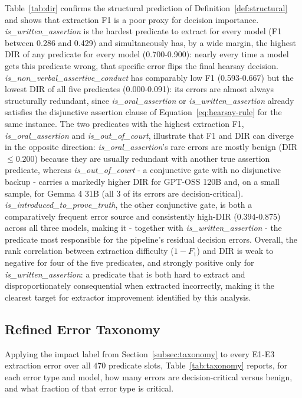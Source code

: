 Table~\ref{tab:dir} confirms the structural prediction of Definition~\ref{def:structural} and shows that extraction F1 is a poor proxy for decision importance. \textit{is\_written\_assertion} is the hardest predicate to extract for every model (F1 between 0.286 and 0.429) and simultaneously has, by a wide margin, the highest DIR of any predicate for every model (0.700-0.900): nearly every time a model gets this predicate wrong, that specific error flips the final hearsay decision. \textit{is\_non\_verbal\_assertive\_conduct} has comparably low F1 (0.593-0.667) but the lowest DIR of all five predicates (0.000-0.091): its errors are almost always structurally redundant, since \textit{is\_oral\_assertion} or \textit{is\_written\_assertion} already satisfies the disjunctive assertion clause of Equation~\ref{eq:hearsay-rule} for the same instance. The two predicates with the highest extraction F1, \textit{is\_oral\_assertion} and \textit{is\_out\_of\_court}, illustrate that F1 and DIR can diverge in the opposite direction: \textit{is\_oral\_assertion}'s rare errors are mostly benign (DIR $\leq 0.200$) because they are usually redundant with another true assertion predicate, whereas \textit{is\_out\_of\_court} - a conjunctive gate with no disjunctive backup - carries a markedly higher DIR for GPT-OSS 120B and, on a small sample, for Gemma 4 31B (all 3 of its errors are decision-critical). \textit{is\_introduced\_to\_prove\_truth}, the other conjunctive gate, is both a comparatively frequent error source and consistently high-DIR (0.394-0.875) across all three models, making it - together with \textit{is\_written\_assertion} - the predicate most responsible for the pipeline's residual decision errors. Overall, the rank correlation between extraction difficulty ($1 - F_1$) and DIR is weak to negative for four of the five predicates, and strongly positive only for \textit{is\_written\_assertion}: a predicate that is both hard to extract and disproportionately consequential when extracted incorrectly, making it the clearest target for extractor improvement identified by this analysis.

\subsection{Refined Error Taxonomy}
\label{subsec:taxonomy-results}
Applying the impact label from Section~\ref{subsec:taxonomy} to every E1-E3 extraction error over all $470$ predicate slots, Table~\ref{tab:taxonomy} reports, for each error type and model, how many errors are decision-critical versus benign, and what fraction of that error type is critical.

